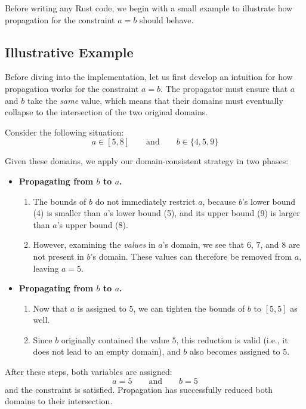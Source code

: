 \documentclass{article}
\begin{document}
Before writing any Rust code, we begin with a small example to illustrate how propagation for the constraint $a = b$ should behave.

\subsection{Illustrative Example}

Before diving into the implementation, let us first develop an intuition for how propagation works for the constraint $a = b$. 
The propagator must ensure that $a$ and $b$ take the \emph{same} value, which means that their domains must eventually collapse to the intersection of the two original domains.

Consider the following situation:
\[
    a \in [5, 8]
    \qquad\text{and}\qquad
    b \in \{4, 5, 9\}
\]

Given these domains, we apply our domain-consistent strategy in two phases:

\begin{itemize}
    \item \textbf{Propagating from $b$ to $a$.}
    \begin{enumerate}
        \item 
            The bounds of $b$ do not immediately restrict $a$, because $b$'s lower bound (4) is smaller than $a$'s lower bound (5), and its upper bound (9) is larger than $a$'s upper bound (8).
        \item 
            However, examining the \emph{values} in $a$'s domain, we see that $6$, $7$, and $8$ are not present in $b$'s domain.  
            These values can therefore be removed from $a$, leaving $a = 5$.
    \end{enumerate}

    \item \textbf{Propagating from $b$ to $a$.}
    \begin{enumerate}
        \item 
            Now that $a$ is assigned to $5$, we can tighten the bounds of $b$ to $[5,5]$ as well.
        \item 
            Since $b$ originally contained the value $5$, this reduction is valid (i.e., it does not lead to an empty domain), and $b$ also becomes assigned to $5$.
    \end{enumerate}
\end{itemize}

After these steps, both variables are assigned:
\[
    a = 5 \qquad\text{and}\qquad b = 5
\]
and the constraint is satisfied.  
Propagation has successfully reduced both domains to their intersection.
\end{document}
